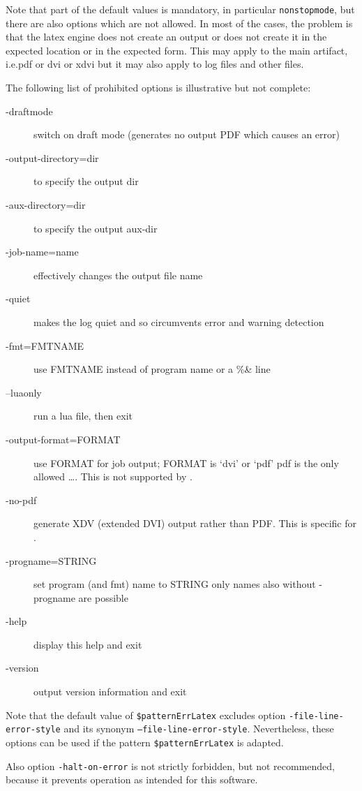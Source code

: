 Note that part of the default values is mandatory, in particular \texttt{nonstopmode}, 
but there are also options which are not allowed. 
In most of the cases, the problem is that the latex engine does not create an output 
or does not create it in the expected location or in the expected form. 
This may apply to the main artifact, i.e.\@ pdf or dvi or xdvi 
but it may also apply to log files and other files. 

The following list of prohibited options is illustrative but not complete: 
%
\begin{description}
  \item[-draftmode] switch on draft mode (generates no output PDF which causes an error) 
  \item[-output-directory=dir] to specify the output dir 
  \item[-aux-directory=dir] to specify the output aux-dir 
  \item[-job-name=name] effectively changes the output file name 
  \item[-quiet] makes the log quiet and 
      so circumvents error and warning detection 
  \item[-fmt=FMTNAME] use FMTNAME instead of program name or a \%\& line 
  \item[--luaonly] run a lua file, then exit 
  \item[-output-format=FORMAT] use FORMAT for job output; FORMAT is `dvi' or `pdf'
                   pdf is the only allowed \dots. 
                   This is not supported by \xelatex. 
  \item[-no-pdf] generate XDV (extended DVI) output rather than PDF. 
   This is specific for \xelatex. 
  \item[-progname=STRING] set program (and fmt) name to STRING
    only names also without -progname are possible 
  \item[-help] display this help and exit
  \item[-version] output version information and exit
\end{description}

Note that the default value of \texttt{\$patternErrLatex} 
excludes option \texttt{-file-line-error-style} 
and its synonym \texttt{--file-line-error-style}. 
Nevertheless, these options can be used 
if the pattern \texttt{\$patternErrLatex} is adapted. 

Also option \texttt{-halt-on-error} is not strictly forbidden, but not recommended, 
because it prevents operation as intended for this software. 


